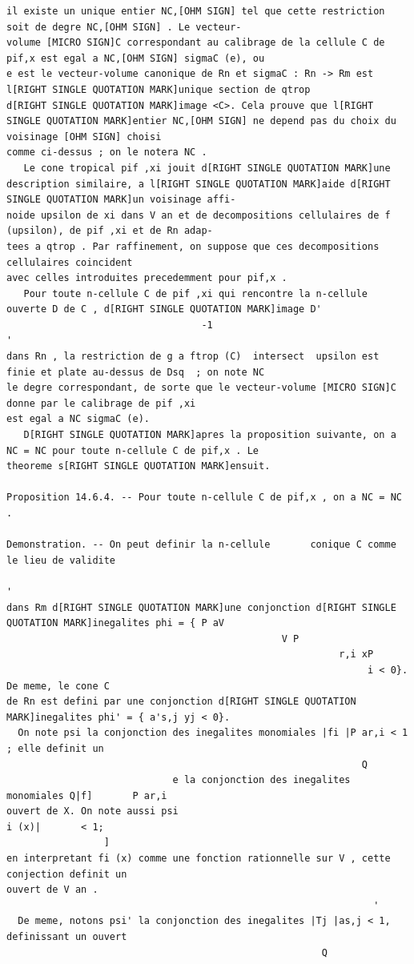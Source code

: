 \documentclass[
  11pt,
]{article}
\begin{document}
\begin{lstlisting}
il existe un unique entier NC,[OHM SIGN] tel que cette restriction soit de degre NC,[OHM SIGN] . Le vecteur-
volume [MICRO SIGN]C correspondant au calibrage de la cellule C de pif,x est egal a NC,[OHM SIGN] sigmaC (e), ou
e est le vecteur-volume canonique de Rn et sigmaC : Rn -> Rm est l[RIGHT SINGLE QUOTATION MARK]unique section de qtrop
d[RIGHT SINGLE QUOTATION MARK]image <C>. Cela prouve que l[RIGHT SINGLE QUOTATION MARK]entier NC,[OHM SIGN] ne depend pas du choix du voisinage [OHM SIGN] choisi
comme ci-dessus ; on le notera NC .
   Le cone tropical pif ,xi jouit d[RIGHT SINGLE QUOTATION MARK]une description similaire, a l[RIGHT SINGLE QUOTATION MARK]aide d[RIGHT SINGLE QUOTATION MARK]un voisinage affi-
noide upsilon de xi dans V an et de decompositions cellulaires de f (upsilon), de pif ,xi et de Rn adap-
tees a qtrop . Par raffinement, on suppose que ces decompositions cellulaires coincident
avec celles introduites precedemment pour pif,x .
   Pour toute n-cellule C de pif ,xi qui rencontre la n-cellule ouverte D de C , d[RIGHT SINGLE QUOTATION MARK]image D'
                                  -1                                              '
dans Rn , la restriction de g a ftrop (C)  intersect  upsilon est finie et plate au-dessus de Dsq  ; on note NC
le degre correspondant, de sorte que le vecteur-volume [MICRO SIGN]C donne par le calibrage de pif ,xi
est egal a NC sigmaC (e).
   D[RIGHT SINGLE QUOTATION MARK]apres la proposition suivante, on a NC = NC pour toute n-cellule C de pif,x . Le
theoreme s[RIGHT SINGLE QUOTATION MARK]ensuit.

Proposition 14.6.4. -- Pour toute n-cellule C de pif,x , on a NC = NC .

Demonstration. -- On peut definir la n-cellule       conique C comme le lieu de validite
                                                                                               '
dans Rm d[RIGHT SINGLE QUOTATION MARK]une conjonction d[RIGHT SINGLE QUOTATION MARK]inegalites phi = { P aV
                                                V P
                                                          r,i xP
                                                               i < 0}. De meme, le cone C
de Rn est defini par une conjonction d[RIGHT SINGLE QUOTATION MARK]inegalites phi' = { a's,j yj < 0}.
  On note psi la conjonction des inegalites monomiales |fi |P ar,i < 1 ; elle definit un
                                                              Q
                             e la conjonction des inegalites monomiales Q|f]       P ar,i
ouvert de X. On note aussi psi                                                 i (x)|       < 1;
                 ]
en interpretant fi (x) comme une fonction rationnelle sur V , cette conjection definit un
ouvert de V an .
                                                                '
  De meme, notons psi' la conjonction des inegalites |Tj |as,j < 1, definissant un ouvert
                                                       Q


\end{lstlisting}
\end{document}
